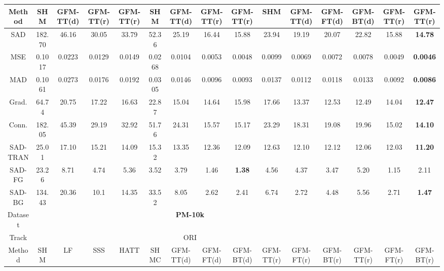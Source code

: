\documentclass[twocolumn]{svjour3}
\begin{document}
\begin{table*}[htbp]
{\begin{tabular}{c|ccccc|ccc|ccc|ccc}
\hline
Method & SHM & \multicolumn{1}{c}{GFM-TT(d)} & \multicolumn{1}{c}{GFM-TT(r)} & \multicolumn{1}{c|}{GFM-TT(r)} &\multicolumn{1}{c}{SHM} &\multicolumn{1}{c}{GFM-TT(d)} & GFM-TT(r)& \multicolumn{1}{c|}{GFM-TT(r)} &SHM & GFM-TT(d)&\multicolumn{1}{c}{GFM-FT(d)} & GFM-BT(d)& GFM-TT(r) & GFM-TT(r)\\
\hline
SAD & 182.70&46.16&30.05&\multicolumn{1}{c|}{33.79} &\multicolumn{1}{c}{52.36} &\multicolumn{1}{c}{25.19}&16.44&\multicolumn{1}{c|}{15.88}&23.94&19.19 &\multicolumn{1}{c}{20.07}&22.82 &15.88&\textbf{14.78}\\
MSE &0.1017&0.0223&0.0129&\multicolumn{1}{c|}{0.0149}&\multicolumn{1}{c}{0.0268} &\multicolumn{1}{c}{0.0104}&0.0053&\multicolumn{1}{c|}{0.0048}&0.0099&\multicolumn{1}{c}{0.0069} &\multicolumn{1}{c}{0.0072}&0.0078 &0.0049&\textbf{0.0046}\\
MAD &0.1061&0.0273&0.0176&\multicolumn{1}{c|}{0.0192}&\multicolumn{1}{c}{0.0305} &\multicolumn{1}{c}{0.0146}&0.0096&\multicolumn{1}{c|}{0.0093}&0.0137&\multicolumn{1}{c}{0.0112}&\multicolumn{1}{c}{0.0118}&0.0133 &0.0092&\textbf{0.0086}\\
Grad. &64.74&20.75&17.22&\multicolumn{1}{c|}{16.63}&\multicolumn{1}{c}{22.87} &15.04&14.64&\multicolumn{1}{c|}{15.98}&17.66&\multicolumn{1}{c}{13.37} &\multicolumn{1}{c}{12.53}&12.49&14.04& \textbf{12.47}\\
Conn. &182.05&45.39&29.19&\multicolumn{1}{c|}{32.92}&\multicolumn{1}{c}{51.76} &24.31&15.57&\multicolumn{1}{c|}{15.17}&23.29&\multicolumn{1}{c}{18.31} &\multicolumn{1}{c}{19.08}&19.96&15.02&\textbf{14.10}\\
SAD-TRAN &25.01&17.10&15.21&\multicolumn{1}{c|}{14.09}&\multicolumn{1}{c}{15.32} &13.35&12.36&\multicolumn{1}{c|}{12.09}&12.63&\multicolumn{1}{c}{12.10} &\multicolumn{1}{c}{12.12}&12.06 &12.03&\textbf{11.20}\\
SAD-FG &23.26&8.71&4.74&\multicolumn{1}{c|}{5.36}&\multicolumn{1}{c}{3.52} &3.79&1.46&\multicolumn{1}{c|}{\textbf{1.38}}&4.56&\multicolumn{1}{c}{4.37} &\multicolumn{1}{c}{3.47}&5.20 &1.15& 2.11\\
SAD-BG &134.43&20.36&10.1&\multicolumn{1}{c|}{14.35}&\multicolumn{1}{c}{33.52} &8.05&2.62&\multicolumn{1}{c|}{2.41}&6.74&\multicolumn{1}{c}{2.72} &\multicolumn{1}{c}{4.48}&5.56 &2.71 & \textbf{1.47}\\
\hline 
Dataset & \multicolumn{11}{|c}{\textbf{PM-10k}} \\
\hline
Track & \multicolumn{11}{|c}{ORI} \\
\hline
Method & SHM & LF & SSS &HATT &SHMC& GFM-TT(d) & GFM-FT(d) & GFM-BT(d)  & GFM-TT(r) & GFM-FT(r) & GFM-BT(r) &GFM-TT(r) &GFM-FT(r) & GFM-BT(r) \\

\end{tabular}}
\end{table*}
\end{document}
